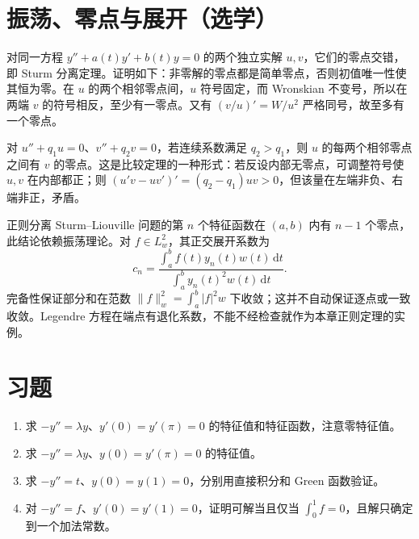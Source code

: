 \section{振荡、零点与展开（选学）}
对同一方程 $y''+a(t)y'+b(t)y=0$ 的两个独立实解 $u,v$，它们的零点交错，即 Sturm 分离定理。证明如下：非零解的零点都是简单零点，否则初值唯一性使其恒为零。在 $u$ 的两个相邻零点间，$u$ 符号固定，而 Wronskian 不变号，所以在两端 $v$ 的符号相反，至少有一零点。又有 $(v/u)'=W/u^2$ 严格同号，故至多有一个零点。

对 $u''+q_1u=0$、$v''+q_2v=0$，若连续系数满足 $q_2>q_1$，则 $u$ 的每两个相邻零点之间有 $v$ 的零点。这是比较定理的一种形式：若反设内部无零点，可调整符号使 $u,v$ 在内部都正；则 $(u'v-uv')'=(q_2-q_1)uv>0$，但该量在左端非负、右端非正，矛盾。

正则分离 Sturm--Liouville 问题的第 $n$ 个特征函数在 $(a,b)$ 内有 $n-1$ 个零点，此结论依赖振荡理论。对 $f\in L^2_w$，其正交展开系数为
\[
 c_n=\frac{\int_a^b f(t)y_n(t)w(t)\,\mathrm dt}{\int_a^b y_n(t)^2w(t)\,\mathrm dt}.
\]
完备性保证部分和在范数 $\|f\|_w^2=\int_a^b|f|^2w$ 下收敛；这并不自动保证逐点或一致收敛。Legendre 方程在端点有退化系数，不能不经检查就作为本章正则定理的实例。

\section{习题}
\begin{enumerate}
 \item\label{ex:ode-neumann} 求 $-y''=\lambda y$、$y'(0)=y'(\pi)=0$ 的特征值和特征函数，注意零特征值。
 \item\label{ex:ode-mixed} 求 $-y''=\lambda y$、$y(0)=y'(\pi)=0$ 的特征值。
 \item 求 $-y''=t$、$y(0)=y(1)=0$，分别用直接积分和 Green 函数验证。
 \item 对 $-y''=f$、$y'(0)=y'(1)=0$，证明可解当且仅当 $\int_0^1f=0$，且解只确定到一个加法常数。
\end{enumerate}

